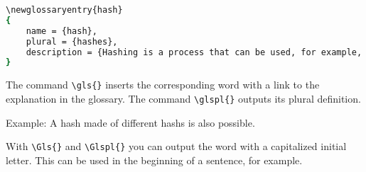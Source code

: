 \begin{lstlisting}[caption=Example of an glossary definition, label=lst:glossary_def_en, language=bash]
\newglossaryentry{hash}
{
    name = {hash},
    plural = {hashes},
    description = {Hashing is a process that can be used, for example, to change a password into a text that cannot be converted back. In this way, data that is only used for comparison can be stored more securely.}
}
\end{lstlisting}

The command \texttt{\textbackslash{}gls\{\}} inserts the corresponding word with a link to the explanation in the glossary. The command \texttt{\textbackslash{}glspl\{\}} outputs its plural definition.

Example: A \gls{hash} made of different \glspl{hash} is also possible.

With \texttt{\textbackslash{}Gls\{\}} and \texttt{\textbackslash{}Glspl\{\}} you can output the word with a capitalized initial letter. This can be used in the beginning of a sentence, for example.